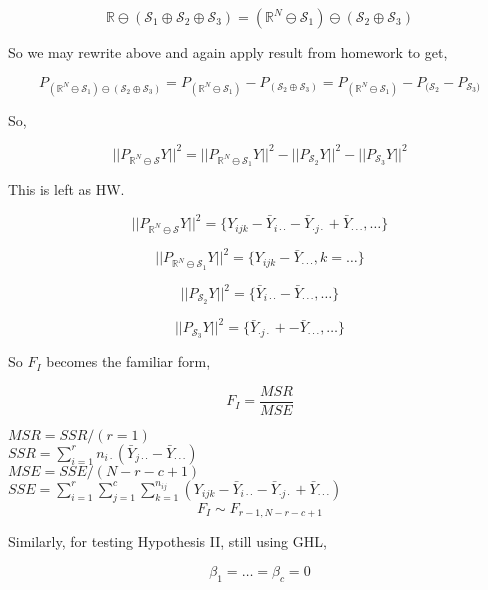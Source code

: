 \documentclass[11pt,fleqn]{book} %
\begin{document}
			$$\mathbb{R} \ominus (\mathcal{S}_1 \oplus \mathcal{S}_2 \oplus \mathcal{S}_3) = (\mathbb{R}^N \ominus \mathcal{S}_1) \ominus (\mathcal{S}_2 \oplus \mathcal{S}_3) $$

So we may rewrite above and again apply result from homework to get, 

			$$P_{(\mathbb{R}^N \ominus \mathcal{S}_1) \ominus (\mathcal{S}_2 \oplus \mathcal{S}_3)} =  P_{(\mathbb{R}^N \ominus \mathcal{S}_1)}  - P_{(\mathcal{S}_2 \oplus \mathcal{S}_3)} = P_{(\mathbb{R}^N \ominus \mathcal{S}_1)}  - P_{(\mathcal{S}_2} - P_{\mathcal{S}_3)} $$

So, 

			$$||P_{\mathbb{R}^N \ominus \mathcal{S}} Y|| ^2 = ||P_{\mathbb{R}^N \ominus \mathcal{S}_1} Y|| ^2 - ||P_{\mathcal{S}_2} Y|| ^2 - ||P_{ \mathcal{S}_3} Y|| ^2 $$

This is left as HW. 


		$$||P_{\mathbb{R}^N \ominus \mathcal{S}} Y|| ^2 = \{Y_{ijk} - \bar{Y}_{i \cdot \cdot} - \bar{Y}_{ \cdot j \cdot} + \bar{Y}_{\cdot \cdot \cdot}, \dots\} $$

		$$||P_{\mathbb{R}^N \ominus \mathcal{S}_1} Y|| ^2 = \{ Y_{ijk} - \bar{Y}_{\cdot \cdot \cdot}, k = \dots \} $$

		$$||P_{\mathcal{S}_2} Y|| ^2 = \{\bar{Y}_{i \cdot \cdot} - \bar{Y}_{\cdot \cdot \cdot}, \dots \} $$

		$$||P_{ \mathcal{S}_3} Y|| ^2 = \{ \bar{Y}_{ \cdot j \cdot} +  - \bar{Y}_{\cdot \cdot \cdot}, \dots\} $$





So $F_I$ becomes the familiar form, 

		$$F_I = \frac{MSR}{MSE} $$

$MSR = SSR / (r = 1)$\\
$SSR = \displaystyle \sum^r_{i = 1} n_{i\cdot} (\bar{Y}_{j \cdot \cdot} - \bar{Y}_{\cdot \cdot \cdot})$\\
$MSE = SSE / (N - r -c +1)$\\
$SSE = \displaystyle \sum^r_{i = 1} \sum^c_{j = 1} \sum^{n_{ij}}_{k = 1} (Y_{ijk} - \bar{Y}_{i \cdot \cdot} - \bar{Y}_{ \cdot j \cdot} + \bar{Y}_{\cdot \cdot \cdot} ) $\\


		$$F_I \sim F_{r - 1 , N - r - c + 1}$$

Similarly, for testing Hypothesis II, still using GHL, 

		$$\beta_1  = \dots = \beta_c = 0 $$
\end{document}
